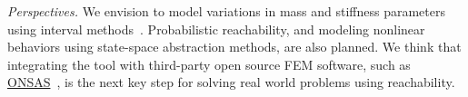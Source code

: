 \documentclass{juliacon}
\begin{document}
\vspace{0.2cm}

\noindent \emph{Perspectives.} We envision to model variations in mass and stiffness parameters using interval methods~\cite{forets2021intervalmat, ferranti2021interval}.
%
Probabilistic reachability, and modeling nonlinear behaviors using state-space abstraction methods, are also planned.
%
We think that integrating the tool with third-party open source FEM software, such as \href{http://onsas.org}{ONSAS}~\cite{onsas}, is the next key step for solving real world problems using reachability.


	
\end{document}
